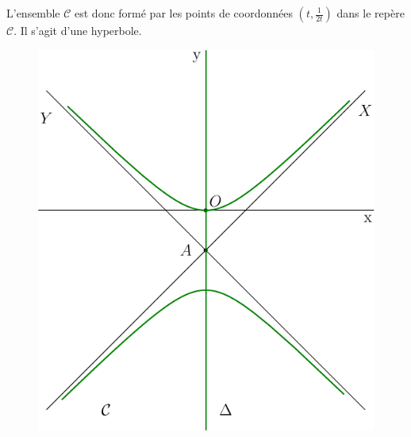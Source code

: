 \begin{enumerate}
\begin{enumerate}
L'ensemble $\mathcal{C}$ est donc formé par les points de coordonnées $(t,\frac{1}{2t})$ dans le repère $\mathcal{C}$. Il s'agit d'une hyperbole.
\end{enumerate}
\begin{figure}[h]
  \centering
  \includegraphics{./Ccomp5_1.pdf}
\end{figure}

\end{enumerate}
